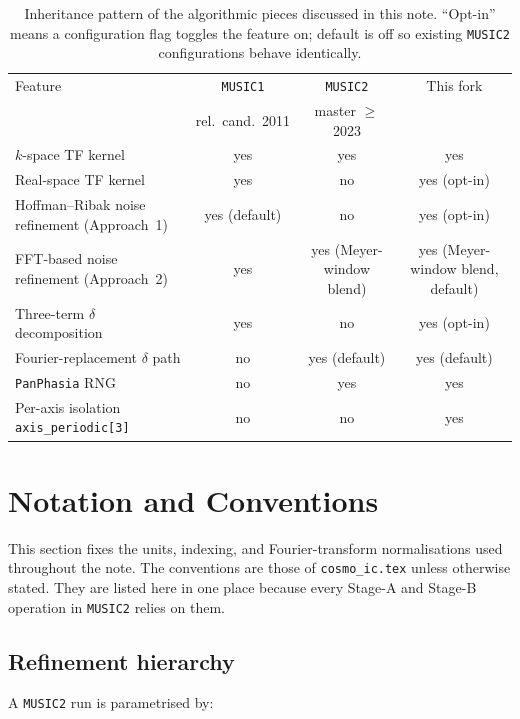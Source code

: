 \documentclass[12pt]{article}
\newcommand{\code}[1]{\texttt{#1}}
\begin{document}
\begin{table}[h]
\centering
\small
\begin{tabular}{lccc}
\toprule
Feature & \texttt{MUSIC1} & \texttt{MUSIC2}     & This fork \\
        & rel.~cand.~2011 & master $\ge$ 2023   &           \\
\midrule
$k$-space TF kernel             & yes  & yes & yes \\
Real-space TF kernel            & yes  & no  & yes (opt-in) \\
Hoffman--Ribak noise refinement (Approach~1) & yes (default) & no & yes (opt-in) \\
FFT-based noise refinement (Approach~2)      & yes  & yes (Meyer-window blend) & yes (Meyer-window blend, default) \\
Three-term $\delta$ decomposition & yes  & no  & yes (opt-in) \\
Fourier-replacement $\delta$ path  & no   & yes (default) & yes (default) \\
\texttt{PanPhasia} RNG              & no   & yes & yes \\
Per-axis isolation \code{axis\_periodic[3]} & no   & no  & yes \\
\bottomrule
\end{tabular}
\caption{Inheritance pattern of the algorithmic pieces discussed in
this note.  ``Opt-in'' means a configuration flag toggles the feature
on; default is off so existing \texttt{MUSIC2} configurations behave
identically.}
\label{tab:lineage}
\end{table}

\section{Notation and Conventions}
\label{sec:notation}

This section fixes the units, indexing, and Fourier-transform
normalisations used throughout the note.  The conventions are those
of \texttt{cosmo\_ic.tex} unless otherwise stated.
They are listed here in one place because every Stage-A and Stage-B
operation in \texttt{MUSIC2} relies on them.

\subsection{Refinement hierarchy}
\label{sec:notation-refinement}

A \texttt{MUSIC2} run is parametrised by:
\end{document}
